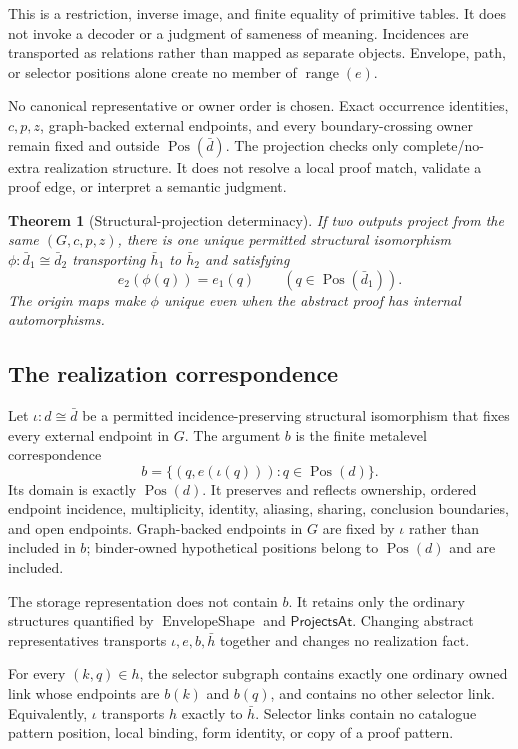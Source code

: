 \documentclass[11pt,twoside]{article}
\newcommand{\ProjectsAt}{\mathsf{ProjectsAt}}
\newtheorem{theorem}{Theorem}
\begin{document}
This is a restriction, inverse image, and finite equality of primitive tables.  It
does not invoke a decoder or a judgment of sameness of meaning.  Incidences are
transported as relations rather than mapped as separate objects.  Envelope, path,
or selector positions alone create no member of \(\operatorname{range}(e)\).

No canonical representative or owner order is chosen.  Exact occurrence
identities, \(c,p,z\), graph-backed external endpoints, and every boundary-crossing
owner remain fixed and outside \(\operatorname{Pos}(\bar d)\).  The projection checks
only complete/no-extra realization structure.  It does not resolve a local proof
match, validate a proof edge, or interpret a semantic judgment.

\begin{theorem}[Structural-projection determinacy]\label{thm:projection}
If two outputs project from the same \((G,c,p,z)\), there is one unique permitted
structural isomorphism
\(\phi:\bar d_1\cong\bar d_2\) transporting \(\bar h_1\) to \(\bar h_2\) and
satisfying
\[
  e_2(\phi(q))=e_1(q)
  \qquad(q\in\operatorname{Pos}(\bar d_1)).
\]
The origin maps make \(\phi\) unique even when the abstract proof has internal
automorphisms.
\end{theorem}

\subsection{The realization correspondence}

Let \(\iota:d\cong\bar d\) be a permitted incidence-preserving structural
isomorphism that fixes every external endpoint in \(G\).  The argument \(b\) is the
finite metalevel correspondence
\[
  b=\{(q,e(\iota(q))):q\in\operatorname{Pos}(d)\}.
\]
Its domain is exactly \(\operatorname{Pos}(d)\).  It preserves and reflects
ownership, ordered endpoint incidence, multiplicity, identity, aliasing, sharing,
conclusion boundaries, and open endpoints.  Graph-backed endpoints in \(G\) are
fixed by \(\iota\) rather than included in \(b\); binder-owned hypothetical
positions belong to \(\operatorname{Pos}(d)\) and are included.

The storage representation does not contain \(b\).  It retains only the ordinary
structures quantified by \(\operatorname{EnvelopeShape}\) and \(\ProjectsAt\).
Changing abstract representatives transports
\(\iota,e,b,\bar h\) together and changes no realization fact.

For every \((k,q)\in h\), the selector subgraph contains exactly one ordinary
owned link whose endpoints are \(b(k)\) and \(b(q)\), and contains no other
selector link.  Equivalently, \(\iota\) transports \(h\) exactly to \(\bar h\).
Selector links contain no catalogue pattern position, local binding, form
identity, or copy of a proof pattern.
\end{document}
